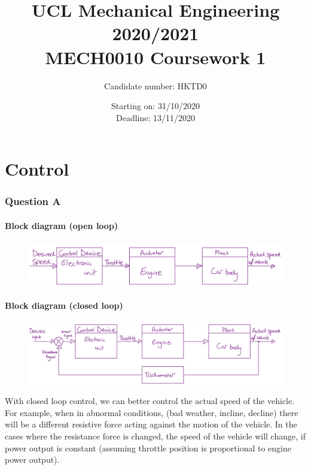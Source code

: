 \documentclass[12pt]{article}
\numberwithin{equation}{section}
\begin{document}
\title{\textbf{UCL Mechanical Engineering 2020/2021}\\MECH0010 Coursework 1}
\date{Starting on: 31/10/2020\\Deadline: 13/11/2020}
\author{Candidate number: HKTD0}
\maketitle
\tableofcontents
\newpage
\part{Control}
\section{Question A}
\subsection*{Block diagram (open loop)}
\begin{figure}[H]
  \centering
  \includegraphics[width=\textwidth]{./img/1-1blockdiagram.png}
\end{figure}
\subsection*{Block diagram (closed loop)}
\begin{figure}[H]
  \centering
  \includegraphics[width=\textwidth]{./img/1-2blockdiagram.png}
\end{figure}
With closed loop control, we can better control the actual speed of the vehicle. For example, when in abnormal conditions, (bad weather, incline, decline) there will be a different resistive force acting against the motion of the vehicle. In the cases where the resistance force is changed, the speed of the vehicle will change, if power output is constant (assuming throttle position is proportional to engine power output). 
\end{document}
